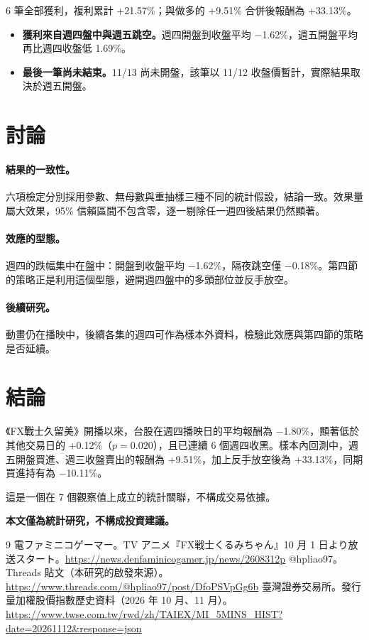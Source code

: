 \documentclass[11pt,a4paper]{article}
\newcommand{\m}{\ensuremath{-}}
\begin{document}
6 筆全部獲利，複利累計 +21.57\%；與做多的 +9.51\% 合併後報酬為 +33.13\%。

\begin{itemize}
\item \textbf{獲利來自週四盤中與週五跳空。}週四開盤到收盤平均 \m 1.62\%，週五開盤平均再比週四收盤低 1.69\%。
\item \textbf{最後一筆尚未結束。}11/13 尚未開盤，該筆以 11/12 收盤價暫計，實際結果取決於週五開盤。
\end{itemize}

\section{討論}

\paragraph{結果的一致性。}六項檢定分別採用參數、無母數與重抽樣三種不同的統計假設，結論一致。效果量屬大效果，95\% 信賴區間不包含零，逐一剔除任一週四後結果仍然顯著。

\paragraph{效應的型態。}週四的跌幅集中在盤中：開盤到收盤平均 \m 1.62\%，隔夜跳空僅 \m 0.18\%。第四節的策略正是利用這個型態，避開週四盤中的多頭部位並反手放空。

\paragraph{後續研究。}動畫仍在播映中，後續各集的週四可作為樣本外資料，檢驗此效應與第四節的策略是否延續。

\section{結論}

《FX戰士久留美》開播以來，台股在週四播映日的平均報酬為 \m 1.80\%，顯著低於其他交易日的 +0.12\%（$p=0.020$），且已連續 6 個週四收黑。樣本內回測中，週五開盤買進、週三收盤賣出的報酬為 +9.51\%，加上反手放空後為 +33.13\%，同期買進持有為 \m 10.11\%。

這是一個在 7 個觀察值上成立的統計關聯，不構成交易依據。

\medskip
\noindent\textbf{本文僅為統計研究，不構成投資建議。}

\begin{thebibliography}{9}
 電ファミニコゲーマー。TV アニメ『FX戦士くるみちゃん』10 月 1 日より放送スタート。\url{https://news.denfaminicogamer.jp/news/2608312p}
 @hpliao97。Threads 貼文（本研究的啟發來源）。\url{https://www.threads.com/@hpliao97/post/DfoPSVpGg6b}
 臺灣證券交易所。發行量加權股價指數歷史資料（2026 年 10 月、11 月）。\url{https://www.twse.com.tw/rwd/zh/TAIEX/MI_5MINS_HIST?date=20261112&response=json}
\end{thebibliography}

\medskip
{}
\end{document}
